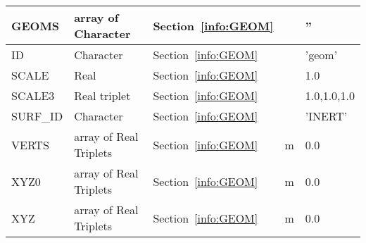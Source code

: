 \documentclass[12pt]{article}
\begin{document}
\begin{longtable}{@{\extracolsep{\fill}}|l|l|l|l|l|}
{\ct GEOMS}        & array of Character            & Section~\ref{info:GEOM}            &           &   {\ct ''}               \\ \hline
{\ct ID}           & Character                     & Section~\ref{info:GEOM}            &           &   {\ct 'geom'}           \\ \hline
{\ct SCALE}        & Real                          & Section~\ref{info:GEOM}            &           &   1.0                    \\ \hline
{\ct SCALE3}       & Real triplet                  & Section~\ref{info:GEOM}            &           &   1.0,1.0,1.0            \\ \hline
{\ct SURF\_ID}     & Character                     & Section~\ref{info:GEOM}            &           &  {\ct 'INERT'}           \\ \hline
{\ct VERTS}        & array of Real Triplets        & Section~\ref{info:GEOM}            &   m       &   0.0                    \\ \hline
{\ct XYZ0}         & array of Real Triplets        & Section~\ref{info:GEOM}            &   m       &   0.0                    \\ \hline
{\ct XYZ}          & array of Real Triplets        & Section~\ref{info:GEOM}            &   m       &   0.0                    \\ \hline

\end{longtable}


\vspace{\baselineskip}
\end{document}
